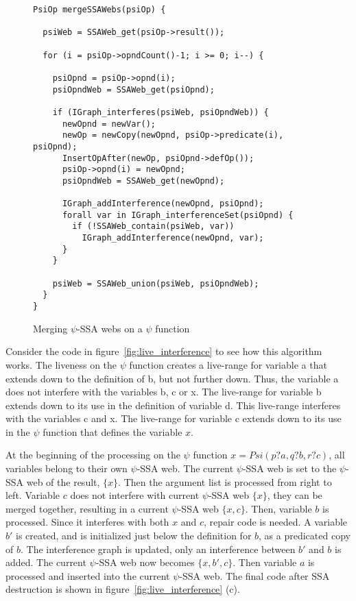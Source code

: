 \begin{figure}
\centering
\footnotesize
\begin{verbatim}
PsiOp mergeSSAWebs(psiOp) {

  psiWeb = SSAWeb_get(psiOp->result());

  for (i = psiOp->opndCount()-1; i >= 0; i--) {

    psiOpnd = psiOp->opnd(i);
    psiOpndWeb = SSAWeb_get(psiOpnd);

    if (IGraph_interferes(psiWeb, psiOpndWeb)) {
      newOpnd = newVar();
      newOp = newCopy(newOpnd, psiOp->predicate(i), psiOpnd);
      InsertOpAfter(newOp, psiOpnd->defOp());
      psiOp->opnd(i) = newOpnd;
      psiOpndWeb = SSAWeb_get(newOpnd);

      IGraph_addInterference(newOpnd, psiOpnd);
      forall var in IGraph_interferenceSet(psiOpnd) {
        if (!SSAWeb_contain(psiWeb, var))
          IGraph_addInterference(newOpnd, var);
      }
    }

    psiWeb = SSAWeb_union(psiWeb, psiOpndWeb);
  }
}

\end{verbatim}
\caption{Merging $\psi$-SSA webs on a $\psi$ function}
\label{fig:pseudo_psi_repair}
\end{figure}


Consider the code in figure~\ref{fig:live_interference} to see how
this algorithm works. The liveness on the $\psi$ function creates a
live-range for variable {a} that extends down to the definition of
{b}, but not further down. Thus, the variable {a} does not
interfere with the variables {b}, {c} or {x}. The
live-range for variable {b} extends down to its use in the
definition of variable {d}. This live-range interferes with the
variables {c} and {x}. The live-range for variable {c}
extends down to its use in the $\psi$ function that defines the
variable ${x}$.

At the beginning of the processing on the $\psi$ function ${x =
  Psi(p?a,q?b,r?c)}$, all variables belong to their own $\psi$-SSA
web. The current $\psi$-SSA web is set to the $\psi$-SSA web of the
result, ${\{x\}}$. Then the argument list is processed from right
to left. Variable ${c}$ does not interfere with current $\psi$-SSA
web ${\{x\}}$, they can be merged together, resulting in a current
$\psi$-SSA web ${\{x, c\}}$. Then, variable ${b}$ is
processed. Since it interferes with both ${x}$ and ${c}$,
repair code is needed. A variable ${b'}$ is created, and is
initialized just below the definition for ${b}$, as a predicated
copy of ${b}$. The interference graph is updated, only an
interference between ${b'}$ and ${b}$ is added. The current
$\psi$-SSA web now becomes ${\{x, b', c\}}$. Then variable ${
  a}$ is processed and inserted into the current $\psi$-SSA web. The
final code after SSA destruction is shown in
figure~\ref{fig:live_interference} (c).

